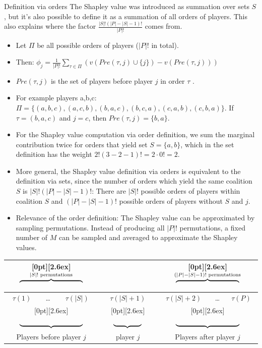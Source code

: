 \documentclass[11pt,compress,t,notes=noshow, xcolor=table]{beamer}
\begin{document}
\begin{vbframe}{Definition via orders}
The Shapley value was introduced as summation over sets $S$, but it's also possible to define it as a summation of all orders of players.
This also explains where the factor $\frac{|S|!(|P| - |S| - 1)!}{|P|!}$ comes from.
\begin{itemize}
  \item Let $\Pi$ be all possible orders of players ($|P|!$ in total).
  \item Then: $\phi_j = \frac{1}{|P|!} \sum_{\tau \in \Pi} (v(Pre(\tau,j) \cup \{j\}) - v(Pre(\tau,j)))$
  \item $Pre(\tau,j)$ is the set of players before player $j$ in order $\tau$ .
  \item For example players a,b,c: $\Pi = \{(a,b,c), (a,c,b), (b,a,c), (b,c,a), (c,a,b), (c,b,a)\}$. If $\tau = (b,a,c)$ and $j=c$, then $Pre(\tau,j) = \{b, a\}$.
  \item For the Shapley value computation via order definition, we sum the marginal contribution twice for orders that yield set $S = \{a,b\}$, which in the set definition has the weight $2! (3 - 2 - 1)! = 2 \cdot 0! = 2$.
  \item More general, the Shapley value definition via orders is equivalent to the definition via sets, since the number of orders which yield the same coalition $S$ is  $|S|!(|P| - |S| - 1)!$: There are $|S|!$ possible orders of players within coalition $S$ and $(|P| - |S| - 1)!$ possible orders of players without $S$ and $j$.
  \item Relevance of the order definition: The Shapley value can be approximated by sampling permutations. Instead of producing all $|P|!$ permutations, a fixed number of $M$ can be sampled and averaged to approximate the Shapley values.
\end{itemize}

  \begin{tabular}{|c|c|c|c|c|c|c|}
    \multicolumn{3}{c}{\enspace\raisebox{-3.3ex}[0pt][2.6ex]{$ \overbrace{\vphantom{-}\hspace{9em}}^{|S|! \text{ permutations}}$}} &
    \multicolumn{1}{c}{} & 
    \multicolumn{3}{c}{\enspace\raisebox{-3.3ex}[0pt][2.6ex]{$ \overbrace{\vphantom{-}\hspace{9em}}^{(|P| - |S| - 1)! \text{ permutations}}$}}\\
    \hline
    $\tau(1)$ & \ldots & $\tau(|S|)$ & $\tau(|S| + 1)$ & $\tau(|S| + 2)$ & \ldots & $\tau(P)$ \\
    \hline
    \multicolumn{3}{c}{\enspace\raisebox{1.3ex}[0pt][2.6ex]{$ \underbrace{\vphantom{-}\hspace{9em}}^{}$}} &
    \multicolumn{1}{c}{\enspace\raisebox{1.3ex}[0pt][2.6ex]{$ \underbrace{\vphantom{-}\hspace{4em}}^{}$}} & 
    \multicolumn{3}{c}{\enspace\raisebox{1.3ex}[0pt][2.6ex]{$ \underbrace{\vphantom{-}\hspace{9em}}^{}$}}\\
    \multicolumn{3}{c}{Players before player $j$} & \multicolumn{1}{c}{player $j$} & \multicolumn{3}{c}{Players after player $j$} \\
  \end{tabular}



\end{vbframe}
\end{document}

